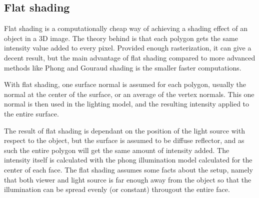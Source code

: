\subsection{Flat shading}

Flat shading is a computationally cheap way of achieving a shading effect of an
object in a 3D image. The theory behind is that each polygon gets the same
intensity value added to every pixel. Provided enough rasterization, it can
give a decent result, but the main advantage of flat shading compared to more
advanced methods like Phong and Gouraud shading is the smaller faster computations. 

With flat shading, one surface normal is assumed for each polygon, usually the
normal at the center of the surface, or an average of the vertex normals. This
one normal is then used in the lighting model, and the resulting intensity
applied to the entire surface.

The result of flat shading is dependant on the position of the light
source with respect to the object, but the surface is assumed to be
diffuse reflector, and as such the entire polygon will get the same amount of
intensity added. The intensity itself is calculated with the phong
illumination model calculated for the center of each face. The flat
shading assumes some facts about the setup, namely that both viewer and light
source is far enough away from the object so that the illumination can be
spread evenly (or constant) througout the entire face.
